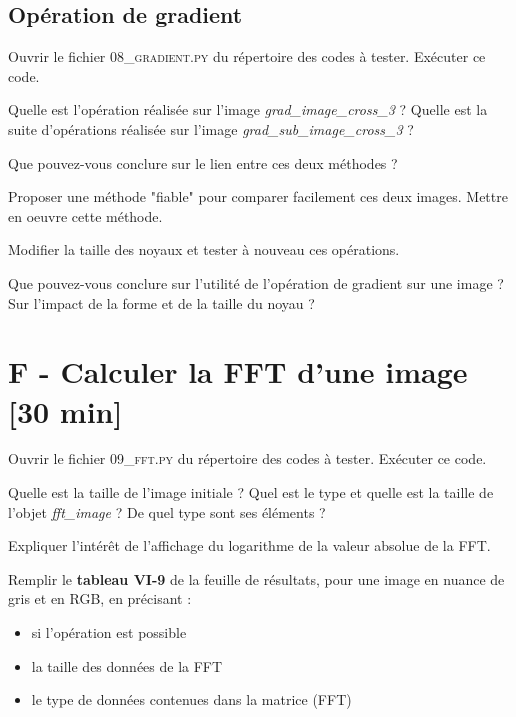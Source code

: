 \subsection{Opération de gradient}

\Manip Ouvrir le fichier \textsc{08\_gradient.py} du répertoire des codes à tester. Exécuter ce code.

\Quest Quelle est l'opération réalisée sur l'image \textsl{grad\_image\_cross\_3} ? Quelle est la suite d'opérations réalisée sur l'image \textsl{grad\_sub\_image\_cross\_3} ?

\Quest Que pouvez-vous conclure sur le lien entre ces deux méthodes ?

\Manip Proposer une méthode "fiable" pour comparer facilement ces deux images. Mettre en oeuvre cette méthode.

\Manip Modifier la taille des noyaux et tester à nouveau ces opérations.

\Quest Que pouvez-vous conclure sur l'utilité de l'opération de gradient sur une image ? Sur l'impact de la forme et de la taille du noyau ?



\newpage
\section{F - Calculer la FFT d'une image {[30 min]}}

\Manip Ouvrir le fichier \textsc{09\_fft.py} du répertoire des codes à tester. Exécuter ce code.

\Quest Quelle est la taille de l'image initiale ? Quel est le type et quelle est la taille de l'objet \textsl{fft\_image} ? De quel type sont ses éléments ?

\Quest Expliquer l'intérêt de l'affichage du logarithme de la valeur absolue de la FFT.

\Manip Remplir le \textbf{tableau VI-9} de la feuille de résultats, pour une image en nuance de gris et en RGB, en précisant : 
\begin{itemize}
	\item si l'opération est possible
	\item la taille des données de la FFT
	\item le type de données contenues dans la matrice (FFT)
\end{itemize} 

